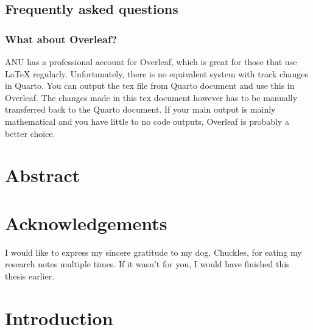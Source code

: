 \documentclass[
  a4paper,
  oneside,
  openany,
  12pt,
  onecolumn]{book}
\theoremstyle{plain}
\theoremstyle{definition}
\theoremstyle{remark}
\begin{document}
\section*{Frequently asked questions}\label{frequently-asked-questions}


\subsection*{What about Overleaf?}\label{what-about-overleaf}

ANU has a professional account for Overleaf, which is great for those
that use LaTeX regularly. Unfortunately, there is no equivalent system
with track changes in Quarto. You can output the tex file from Quarto
document and use this in Overleaf. The changes made in this tex document
however has to be manually transferred back to the Quarto document. If
your main output is mainly mathematical and you have little to no code
outputs, Overleaf is probably a better choice.


\chapter*{Abstract}\label{abstract}



\chapter*{Acknowledgements}\label{acknowledgements}


I would like to express my sincere gratitude to my dog, Chuckles, for
eating my research notes multiple times. If it wasn't for you, I would
have finished this thesis earlier.


\chapter{Introduction}\label{sec-intro}
\end{document}

